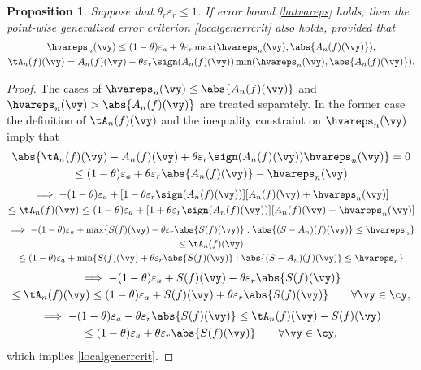 \documentclass[]{elsarticle}
\newtheorem{prop}[theorem]{Proposition}
\theoremstyle{definition}
\theoremstyle{remark}
\begin{document}
\begin{prop} Suppose that $\theta_r \varepsilon_r \le 1$.  If error bound \eqref{hatvareps} holds, then the point-wise generalized error criterion \eqref{localgenerrcrit} also holds, provided that
\begin{gather*}
\hvareps_n(\vy) \le (1-\theta) \varepsilon_a + \theta \varepsilon_r \max(\hvareps_n(\vy), \abs{A_n(f)(\vy)}), \\
\tA_n(f)(\vy) = A_n(f)(\vy) - \theta \varepsilon_r \sign(A_n(f)(\vy)) \min(\hvareps_n(\vy), \abs{A_n(f)(\vy)}).
\end{gather*}
\end{prop}
\begin{proof}  The cases of $\hvareps_n(\vy) \le \abs{A_n(f)(\vy)}$ and $\hvareps_n(\vy) > \abs{A_n(f)(\vy)}$ are treated separately.  
In the former case the definition of $\tA_n(f)(\vy)$ and the inequality constraint on $\hvareps_n(\vy)$ imply that
\begin{multline*}
\abs{\tA_n(f)(\vy) - A_n(f)(\vy) + \theta \varepsilon_r \sign(A_n(f)(\vy)) \hvareps_n(\vy)}= 0  \\ \le (1-\theta)\varepsilon_a  + \theta \varepsilon_r\abs{A_n(f)(\vy)} - \hvareps_n(\vy)
\end{multline*}
\begin{multline*}
\implies -(1-\theta)\varepsilon_a + [1 - \theta \varepsilon_r\sign(A_n(f)(\vy))] [A_n(f)(\vy) + \hvareps_n(\vy)] \\
\le  \tA_n(f)(\vy) \le (1-\theta)\varepsilon_a + [1 + \theta \varepsilon_r\sign(A_n(f)(\vy))] [A_n(f)(\vy) - \hvareps_n(\vy)]
\end{multline*}
\begin{multline*}
\implies -(1-\theta)\varepsilon_a + \max\{S(f)(\vy) - \theta \varepsilon_r\abs{S(f)(\vy)} : \abs{(S-A_n)(f) (\vy)} \le \hvareps_n\} \\
\le  \tA_n(f)(\vy) \\
 \le (1-\theta)\varepsilon_a + \min\{S(f)(\vy) + \theta \varepsilon_r\abs{S(f)(\vy)} : \abs{(S-A_n)(f) (\vy)} \le \hvareps_n\}
\end{multline*}
\begin{multline*}
\implies -(1-\theta)\varepsilon_a + S(f)(\vy) - \theta \varepsilon_r\abs{S(f)(\vy)} \\
\le  \tA_n(f)(\vy)
 \le (1-\theta)\varepsilon_a + S(f)(\vy) + \theta \varepsilon_r\abs{S(f)(\vy)}  \qquad \forall \vy \in \cy,
\end{multline*}
\begin{multline*}
\implies -(1-\theta)\varepsilon_a - \theta \varepsilon_r\abs{S(f)(\vy)}
\le  \tA_n(f)(\vy) - S(f)(\vy) \\
 \le (1-\theta)\varepsilon_a + \theta \varepsilon_r\abs{S(f)(\vy)}  \qquad \forall \vy \in \cy,
\end{multline*}
which implies \eqref{localgenerrcrit}.


\end{proof}
\end{document}

